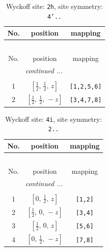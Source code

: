 \documentclass[fleqn,8pt]{jsarticle}
\begin{document}
\begin{longtable}{ccc}
\caption{Wyckoff site: {\tt 2h}, site symmetry: {\tt 4'..}}
 \\
 \hline \hline
No. & position & mapping \\ \hline \endfirsthead

\multicolumn{2}{l}{\tablename\ \thetable{}} \\
 \hline \hline
No. & position & mapping \\ \hline \endhead

 \hline \hline
\multicolumn{2}{r}{\footnotesize\it continued ...} \\ \endfoot

 \hline \hline
\multicolumn{2}{r}{} \\ \endlastfoot

1 & $\left[ \frac{1}{2},\, \frac{1}{2},\, z \right]$ & {\tt [1,2,5,6]} \\ \hline
2 & $\left[ \frac{1}{2},\, \frac{1}{2},\, - z \right]$ & {\tt [3,4,7,8]} \\
\end{longtable}
\renewcommand{\arraystretch}{1.2}
\begin{longtable}{ccc}
\caption{Wyckoff site: {\tt 4i}, site symmetry: {\tt 2..}}
 \\
 \hline \hline
No. & position & mapping \\ \hline \endfirsthead

\multicolumn{2}{l}{\tablename\ \thetable{}} \\
 \hline \hline
No. & position & mapping \\ \hline \endhead

 \hline \hline
\multicolumn{2}{r}{\footnotesize\it continued ...} \\ \endfoot

 \hline \hline
\multicolumn{2}{r}{} \\ \endlastfoot

1 & $\left[ 0,\, \frac{1}{2},\, z \right]$ & {\tt [1,2]} \\ \hline
2 & $\left[ \frac{1}{2},\, 0,\, - z \right]$ & {\tt [3,4]} \\ \hline
3 & $\left[ \frac{1}{2},\, 0,\, z \right]$ & {\tt [5,6]} \\ \hline
4 & $\left[ 0,\, \frac{1}{2},\, - z \right]$ & {\tt [7,8]} \\
\end{longtable}
\renewcommand{\arraystretch}{1.2}
\end{document}
